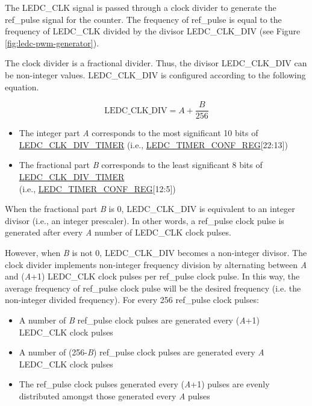 \documentclass[main\_\_EN.tex]{subfiles}
\begin{document}
The LEDC\_CLK signal is passed through a clock divider to generate the ref\_pulse signal for the counter. The frequency of ref\_pulse is equal to the frequency of LEDC\_CLK divided by the divisor LEDC\_CLK\_DIV (see Figure \ref{fig:ledc-pwm-generator}).

The clock divider is a fractional divider. Thus, the divisor LEDC\_CLK\_DIV can be non-integer values. LEDC\_CLK\_DIV is configured according to the following equation.

\begin{equation}
\textrm{LEDC\_CLK\_DIV} = A + \frac{B}{256}
\end{equation}

\begin{itemize}
    \item The integer part \textit{A} corresponds to the most significant 10 bits of \hyperref[fielddesc:LEDCCLKDIVTIMERN]{LEDC\_CLK\_DIV\_TIMER} (i.e., \hyperref[regdesc:LEDCTIMERNCONFREG]{LEDC\_TIMER\_CONF\_REG}[22:13])
    \item The fractional part \textit{B} corresponds to the least significant 8 bits of \hyperref[fielddesc:LEDCCLKDIVTIMERN]{LEDC\_CLK\_DIV\_TIMER} \\(i.e., \hyperref[regdesc:LEDCTIMERNCONFREG]{LEDC\_TIMER\_CONF\_REG}[12:5])
\end{itemize}

When the fractional part \textit{B} is 0, LEDC\_CLK\_DIV is equivalent to an integer divisor (i.e., an integer prescaler). In other words, a ref\_pulse clock pulse is generated after every \textit{A} number of LEDC\_CLK clock pulses.

However, when \textit{B} is not 0, LEDC\_CLK\_DIV becomes a non-integer divisor. The clock divider implements non-integer frequency division by alternating between \textit{A} and (\textit{A}+1) LEDC\_CLK clock pulses per ref\_pulse clock pulse. In this way, the average frequency of ref\_pulse clock pulse will be the desired frequency (i.e. the non-integer divided frequency). For every 256 ref\_pulse clock pulses:

\begin{itemize}
    \item A number of \textit{B} ref\_pulse clock pulses are generated every (\textit{A}+1) LEDC\_CLK clock pulses
    \item A number of (256-\textit{B}) ref\_pulse clock pulses are generated every \textit{A} LEDC\_CLK clock pulses
    \item The ref\_pulse clock pulses generated every (\textit{A}+1) pulses are evenly distributed amongst those generated every \textit{A} pulses
\end{itemize}
\end{document}
